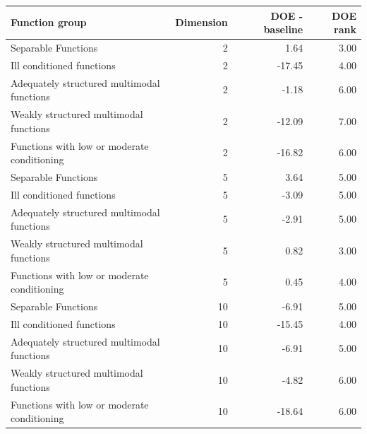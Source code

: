 \begin{tabular}{lrrr}
\toprule
Function group & Dimension & DOE - baseline & DOE rank \\
\midrule
Separable Functions & 2 & 1.64 & 3.00 \\
Ill conditioned functions & 2 & -17.45 & 4.00 \\
Adequately structured multimodal functions & 2 & -1.18 & 6.00 \\
Weakly structured multimodal functions & 2 & -12.09 & 7.00 \\
Functions with low or moderate conditioning & 2 & -16.82 & 6.00 \\
Separable Functions & 5 & 3.64 & 5.00 \\
Ill conditioned functions & 5 & -3.09 & 5.00 \\
Adequately structured multimodal functions & 5 & -2.91 & 5.00 \\
Weakly structured multimodal functions & 5 & 0.82 & 3.00 \\
Functions with low or moderate conditioning & 5 & 0.45 & 4.00 \\
Separable Functions & 10 & -6.91 & 5.00 \\
Ill conditioned functions & 10 & -15.45 & 4.00 \\
Adequately structured multimodal functions & 10 & -6.91 & 5.00 \\
Weakly structured multimodal functions & 10 & -4.82 & 6.00 \\
Functions with low or moderate conditioning & 10 & -18.64 & 6.00 \\
\bottomrule
\end{tabular}
